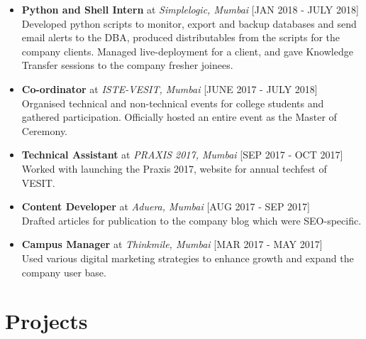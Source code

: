 \documentclass[11pt,a4paper]{moderncv}
\begin{document}
\begin{itemize}
	
	\item \textbf{Python and Shell Intern} at \textit{Simplelogic, Mumbai} \hfill [JAN 2018 - JULY 2018]\\
    Developed python scripts to monitor, export and backup  databases and send email alerts to the DBA, produced distributables from the scripts for the company clients. Managed live-deployment for a client, and gave Knowledge Transfer sessions to the company fresher joinees. 

\item \textbf{Co-ordinator} at \textit{ISTE-VESIT, Mumbai} \hfill [JUNE 2017 - JULY 2018]\\
    Organised technical and non-technical events for college students and gathered participation.
Officially hosted an entire event as the Master of Ceremony.

\item \textbf{Technical Assistant} at \textit{PRAXIS 2017, Mumbai} \hfill [SEP 2017 - OCT 2017]\\
    Worked with launching the Praxis 2017, website for annual techfest of VESIT.

\item \textbf{Content Developer} at \textit{Aduera, Mumbai} \hfill [AUG 2017 - SEP 2017]\\
    Drafted articles for publication to the company blog which were SEO-specific.

\item \textbf{Campus Manager} at \textit{Thinkmile, Mumbai} \hfill [MAR 2017 - MAY 2017]\\
    Used various digital marketing strategies to enhance growth and expand the company user base.

\end{itemize}

\section{Projects}
\end{document}
